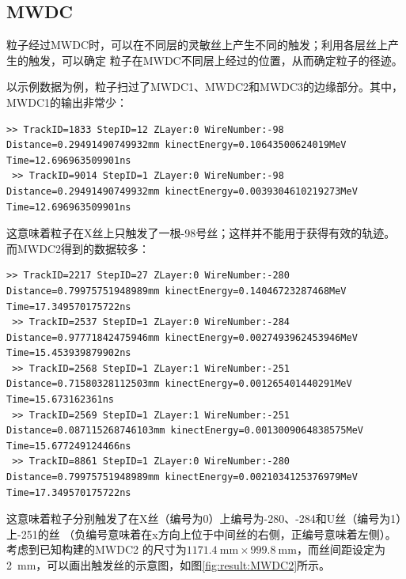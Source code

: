 \documentclass[bachelor,openany,oneside,color]{buaathesis}
\begin{document}
\subsection{MWDC}

粒子经过MWDC时，可以在不同层的灵敏丝上产生不同的触发；利用各层丝上产生的触发，可以确定
粒子在MWDC不同层上经过的位置，从而确定粒子的径迹。

以示例数据为例，粒子扫过了MWDC1、MWDC2和MWDC3的边缘部分。其中，MWDC1的输出非常少：

\begin{lstlisting}[caption={MWDC1},firstnumber=3709,lastline=3710]
 >> TrackID=1833 StepID=12 ZLayer:0 WireNumber:-98 Distance=0.29491490749932mm kinectEnergy=0.10643500624019MeV Time=12.696963509901ns
 >> TrackID=9014 StepID=1 ZLayer:0 WireNumber:-98 Distance=0.29491490749932mm kinectEnergy=0.0039304610219273MeV Time=12.696963509901ns
\end{lstlisting}

这意味着粒子在X丝上只触发了一根-98号丝；这样并不能用于获得有效的轨迹。
而MWDC2得到的数据较多：

\begin{lstlisting}[caption={MWDC2},firstnumber=3760,lastline=3768]
 >> TrackID=2217 StepID=27 ZLayer:0 WireNumber:-280 Distance=0.79975751948989mm kinectEnergy=0.14046723287468MeV Time=17.349570175722ns
 >> TrackID=2537 StepID=1 ZLayer:0 WireNumber:-284 Distance=0.97771842475946mm kinectEnergy=0.0027493962453946MeV Time=15.453939879902ns
 >> TrackID=2568 StepID=1 ZLayer:1 WireNumber:-251 Distance=0.71580328112503mm kinectEnergy=0.001265401440291MeV Time=15.673162361ns
 >> TrackID=2569 StepID=1 ZLayer:1 WireNumber:-251 Distance=0.087115268746103mm kinectEnergy=0.0013009064838575MeV Time=15.677249124466ns
 >> TrackID=8861 StepID=1 ZLayer:0 WireNumber:-280 Distance=0.79975751948989mm kinectEnergy=0.0021034125376979MeV Time=17.349570175722ns
\end{lstlisting}

这意味着粒子分别触发了在X丝（编号为0）上编号为-280、-284和U丝（编号为1）上-251的丝
（负编号意味着在x方向上位于中间丝的右侧，正编号意味着左侧）。考虑到已知构建的MWDC2
的尺寸为$\SI{1171.4}{\milli\meter}\times\SI{999.8}{\milli\meter}$，而丝间距设定为
\SI{2}{\milli\meter}，可以画出触发丝的示意图，如图\ref{fig:result:MWDC2}所示。
\end{document}
